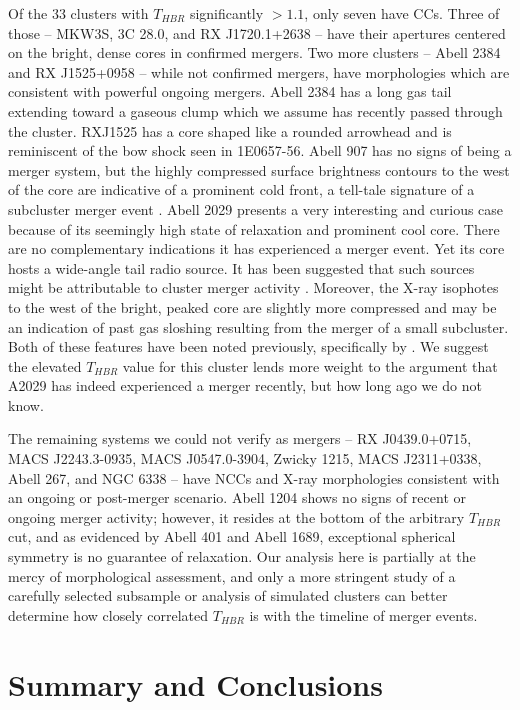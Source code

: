 \documentclass[12pt,preprint]{aastex}
\begin{document}
Of the 33 clusters with $T_{HBR}$ significantly $> 1.1$, only seven
have CCs. Three of those -- MKW3S, 3C 28.0, and RX J1720.1+2638 -- have
their apertures centered on the bright, dense cores in confirmed
mergers. Two more clusters -- Abell 2384 and RX J1525+0958 -- while not
confirmed mergers, have morphologies which are consistent with
powerful ongoing mergers. Abell 2384 has a long gas tail extending
toward a gaseous clump which we assume has recently passed through the
cluster. RXJ1525 has a core shaped like a rounded arrowhead and is
reminiscent of the bow shock seen in 1E0657-56. Abell 907 has no signs
of being a merger system, but the highly compressed surface brightness
contours to the west of the core are indicative of a prominent cold
front, a tell-tale signature of a subcluster merger event
\citep{2007PhR...443....1M}. Abell 2029 presents a very interesting
and curious case because of its seemingly high state of relaxation and
prominent cool core. There are no complementary indications it has
experienced a merger event. Yet its core hosts a wide-angle tail
radio source. It has been suggested that such sources might be
attributable to cluster merger activity
\citep{2000MNRAS.311..649S}. Moreover, the X-ray isophotes to the west
of the bright, peaked core are slightly more compressed and may be an
indication of past gas sloshing resulting from the merger of a small
subcluster. Both of these features have been noted previously,
specifically by \cite{2004ApJ...616..178C, 2005xrrc.procE7.08C}. We
suggest the elevated $T_{HBR}$ value for this cluster lends more
weight to the argument that A2029 has indeed experienced a merger
recently, but how long ago we do not know.

The remaining systems we could not verify as mergers -- RX
J0439.0+0715, MACS J2243.3-0935, MACS J0547.0-3904, Zwicky 1215, MACS
J2311+0338, Abell 267, and NGC 6338 -- have NCCs and X-ray
morphologies consistent with an ongoing or post-merger scenario. Abell
1204 shows no signs of recent or ongoing merger activity; however, it
resides at the bottom of the arbitrary $T_{HBR}$ cut, and as evidenced
by Abell 401 and Abell 1689, exceptional spherical symmetry is no
guarantee of relaxation. Our analysis here is partially at the mercy
of morphological assessment, and only a more stringent study of a
carefully selected subsample or analysis of simulated clusters can
better determine how closely correlated $T_{HBR}$ is with the timeline
of merger events.

\section{Summary and Conclusions}\label{sec:summary}
\end{document}
